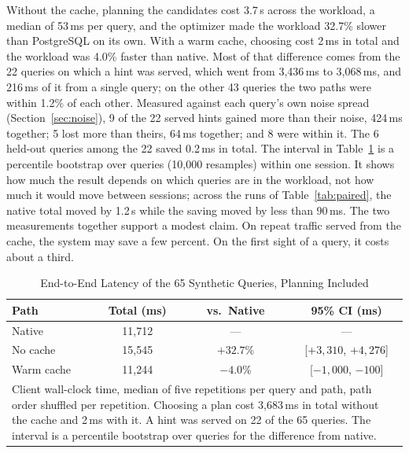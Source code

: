 \documentclass[conference]{IEEEtran}
\begin{document}
Without the cache, planning the candidates cost 3.7\,s across the workload, a
median of 53\,ms per query, and the optimizer made the workload 32.7\% slower
than PostgreSQL on its own. With a warm cache, choosing cost 2\,ms in total
and the workload was 4.0\% faster than native. Most of that difference comes
from the 22 queries on which a hint was served, which went from 3,436\,ms to
3,068\,ms, and 216\,ms of it from a single query; on the other 43 queries the
two paths were within 1.2\% of each other. Measured against each query's own
noise spread (Section~\ref{sec:noise}), 9 of the 22 served hints gained more
than their noise, 424\,ms together; 5 lost more than theirs, 64\,ms together;
and 8 were within it. The 6 held-out queries among the 22 saved 0.2\,ms in
total. The interval in
Table~\ref{tab:e2e} is a percentile bootstrap over queries (10,000 resamples)
within one session. It shows how much the result depends on which queries are
in the workload, not how much it would move between sessions; across the runs
of Table~\ref{tab:paired}, the native total moved by 1.2\,s while the saving
moved by less than 90\,ms. The two measurements together support a modest
claim. On repeat traffic served from the cache, the system
may save a few percent. On the first sight of a query, it costs about a third.

\begin{table}[t]
\caption{End-to-End Latency of the 65 Synthetic Queries, Planning Included}
\label{tab:e2e}
\centering
\footnotesize
\setlength{\tabcolsep}{3pt}
\begin{tabular}{|l|c|c|c|}
\hline
\textbf{Path} & \textbf{Total (ms)} & \textbf{vs.\ Native} &
  \textbf{95\% CI (ms)} \\
\hline
Native & 11,712 & --- & --- \\
No cache & 15,545 & $+32.7$\% & [$+3{,}310$, $+4{,}276$] \\
Warm cache & 11,244 & $-4.0$\% & [$-1{,}000$, $-100$] \\
\hline
\multicolumn{4}{p{0.92\columnwidth}}{\scriptsize Client wall-clock time,
median of five repetitions per query and path, path order shuffled per
repetition. Choosing a plan cost 3,683\,ms in total without the cache and
2\,ms with it. A hint was served on 22 of the 65 queries. The interval is a
percentile bootstrap over queries for the difference from native.}
\end{tabular}
\end{table}

\end{document}
